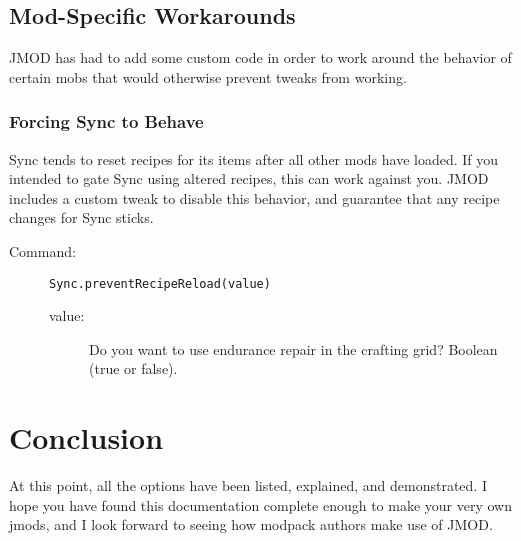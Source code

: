\documentclass[letterpaper,titlepage,12pt]{article}
\begin{document}
\subsection{Mod-Specific Workarounds}

JMOD has had to add some custom code in order to work around the behavior of certain mobs that would otherwise prevent tweaks from working.

\subsubsection{Forcing Sync to Behave}

Sync tends to reset recipes for its items after all other mods have loaded.  If you intended to gate Sync using altered recipes, this can work against you.  JMOD includes a custom tweak to disable this behavior, and guarantee that any recipe changes for Sync sticks.

\begin{description}
\item[Command:] \texttt{Sync.preventRecipeReload(value)}
\begin{description}
\item [value:] Do you want to use endurance repair in the crafting grid?  Boolean (true or false).
\end{description}
\end{description}

\section*{Conclusion}

At this point, all the options have been listed, explained, and demonstrated.  I hope you have found this documentation complete enough to make your very own jmods, and I look forward to seeing how modpack authors make use of JMOD.
\end{document}
